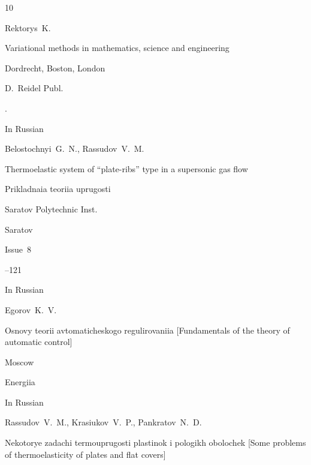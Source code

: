 \begin{thebibliography}{10}

\by Rektorys~K.

\book Variational methods in mathematics, science and engineering


\publaddr Dordrecht, Boston,  London

\publ D.~Reidel Publ. 



\moreref

. \nofrills






\lang In Russian

\by Belostochnyi~G.~N., Rassudov~V.~M.

\paper Thermoelastic system of ``plate-ribs'' type  in a supersonic gas flow

\inbook Prikladnaia teoriia uprugosti

\publ Saratov Polytechnic Inst.

\publaddr Saratov 

\volinfo Issue~8


--121








\lang In Russian

\by Egorov~K.~V.

\book Osnovy teorii avtomaticheskogo regulirovaniia \rm [Fundamentals of the theory of automatic control]

\publaddr Moscow

\publ Energiia








\lang In Russian

\by Rassudov~V.~M., Krasiukov~V.~P., Pankratov~N.~D.  

\book  Nekotorye zadachi termouprugosti plastinok i pologikh obolochek  \rm [Some problems of thermoelasticity of plates and flat covers]


\end{thebibliography}
